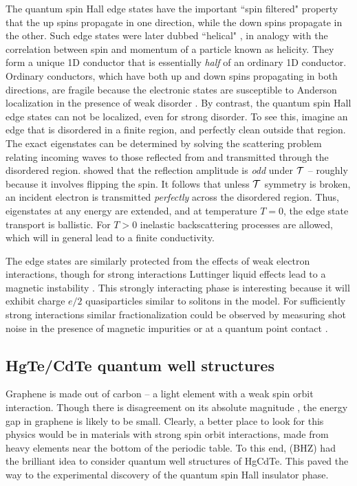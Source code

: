 \documentclass[twocolumn,floatfix,showpacs,rmp,aps]{revtex4}
\begin{document}
	The quantum spin Hall edge states have the
	important ``spin filtered" property that the up spins propagate in one direction,
	while the down spins propagate in the other.  Such edge states were later dubbed
	``helical" \cite{wu06}, in analogy with the correlation between spin and momentum
	of a particle known as helicity.
	They form a unique 1D conductor that is essentially {\it half} of an ordinary 1D conductor.
	Ordinary conductors, which have both up and down spins propagating in
	both directions, are fragile because the electronic states are
	susceptible to Anderson localization in the presence of weak
	disorder \cite{anderson58,lee85}.  By contrast, the quantum spin Hall edge states can not be localized,
	even for strong disorder.  To see this, imagine an edge that is
	disordered in a finite region, and perfectly clean outside that
	region.  The exact eigenstates can be determined by solving the
	scattering problem relating incoming waves to those reflected from
	and transmitted through the disordered region.  \textcite{kanemele05a}
	showed that the reflection amplitude is {\it odd} under ${\cal T}$
	-- roughly because it involves flipping the spin.  It
	follows that unless ${\cal T}$ symmetry is broken, an incident
	electron is transmitted {\it perfectly} across the disordered region.
	Thus, eigenstates at any energy are extended, and
	at temperature $T=0$, the edge state transport is
	ballistic.  For $T>0$ inelastic backscattering processes are
	allowed, which will in general lead to a finite conductivity.
	
	The edge states are similarly protected from the
	effects of weak electron interactions, though for strong interactions Luttinger liquid
	effects lead to a magnetic instability \cite{wu06,xu06}.   This
	strongly interacting phase is interesting because it will
	exhibit charge $e/2$ quasiparticles similar to
	solitons in the \textcite{su79} model.  For sufficiently strong interactions
	similar fractionalization could
	be observed by measuring shot noise in the presence of magnetic
	impurities \cite{maciejko09} or at a quantum point contact \cite{teokane09}.
	
	\subsection{HgTe/CdTe quantum well structures}
	\label{sec:hgcdte}
	
	Graphene is made out of carbon -- a
	light element with a weak spin orbit interaction.  Though there
	is disagreement on its absolute magnitude \cite{min06,huertas06,yao07,boettger07,gmitra09},
	the energy gap in graphene is likely to be small.
	Clearly, a better place to look for this physics would be in
	materials with strong spin orbit interactions, made from
	heavy elements near the bottom of the periodic table.
	To this end, \textcite{bernevighugheszhang06} (BHZ) had the brilliant idea to
	consider quantum well structures of HgCdTe.  This paved
	the way to the experimental discovery of the quantum spin Hall
	insulator phase.
	
\end{document}
